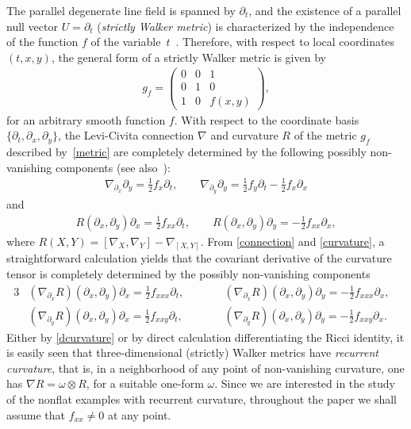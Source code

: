 \documentclass[pdftex]{sigma}
\numberwithin{equation}{section}
\begin{document}
The parallel degenerate line f\/ield is spanned by $\partial_{t}$, and the existence of a parallel null vector $U = \partial_{t}$ ({\em strictly Walker metric}) is {characterized} by the independence of {the function $f$} of the variable~$t$~\cite{W}. Therefore, with respect to local coordinates~$(t,x,y)$, the general form of a strictly Walker metric is given by
\begin{gather}\label{metric}
g_f =\left(
\begin{matrix}
0 & 0 & 1 \\
0 & 1 & 0 \\
1 & 0 & f(x,y)
\end{matrix}
\right),
\end{gather}
for an arbitrary smooth function $f$. With respect to the coordinate basis $\{\partial_t,\partial_x,\partial_y\}$, the Levi-Civita connection $\nabla$ and curvature $R$ of the metric $g_f$ described by~\eqref{metric} are completely determined by the following possibly non-vanishing components (see also~\cite{ChGRVA}):
\begin{gather}\label{connection}
\nabla_{\partial_x} \partial_y = \tfrac{1}{2} f_x \partial_t, \qquad \nabla_{\partial_y} \partial_y = \tfrac{1}{2} f_y \partial_t - \tfrac{1}{2} f_x \partial_x
\end{gather}
and
\begin{gather}\label{curvature}
R(\partial_x,\partial_y)\partial_x = \tfrac{1}{2} f_{xx} \partial_t, \qquad R(\partial_x,\partial_y)\partial_y = -\tfrac{1}{2} f_{xx} \partial_x,
\end{gather}
where $R(X,Y)=[\nabla_X,\nabla_Y]-\nabla_{[X,Y]}$. From \eqref{connection} and \eqref{curvature}, a straightforward calculation yields that the covariant derivative of the curvature tensor is completely determined by the possibly non-vanishing components
\begin{alignat}{3}
& (\nabla _{\partial_x} R) (\partial_x,\partial_y)\partial_x=\tfrac{1}{2} f_{xxx} \partial_t,\qquad&& (\nabla _{\partial_x} R) (\partial_x,\partial_y)\partial_y=-\tfrac{1}{2} f_{xxx} \partial_x, & \nonumber\\
& (\nabla_{\partial_y} R) (\partial_x,\partial_y)\partial_x=\tfrac{1}{2} f_{xxy} \partial_t ,\qquad && (\nabla_{\partial_y} R) (\partial_x,\partial_y)\partial_y=-\tfrac{1}{2} f_{xxy} \partial_x .& \label{dcurvature}
\end{alignat}
Either by \eqref{dcurvature} or by direct calculation dif\/ferentiating the Ricci identity, it is easily seen that three-dimensional (strictly) Walker metrics have {\em recurrent curvature}, that is, in a neighborhood of any point of non-vanishing curvature, one has $\nabla R =\omega \otimes R$, for a suitable one-form $\omega$. Since we are interested in the study of the nonf\/lat examples with recurrent curvature, throughout the paper we shall assume that $f_{xx} \neq 0$ at any point.
\end{document}
